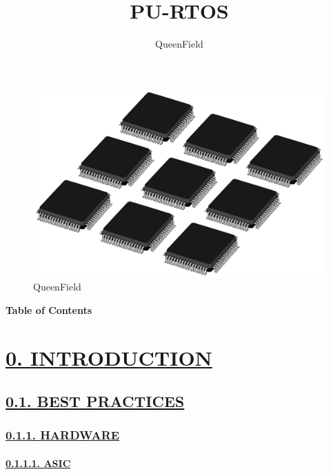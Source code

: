 \documentclass[
]{article}
\title{PU-RTOS}
\author{QueenField}
\date{}
\begin{document}
\maketitle

\begin{figure}
\centering
\includegraphics{../icon.jpg}
\caption{QueenField}
\end{figure}

\textbf{Table of Contents}

\hypertarget{introduction}{%
\section{\texorpdfstring{\protect\hyperlink{introduction-1}{0.
INTRODUCTION}}{0. INTRODUCTION}}\label{introduction}}

\hypertarget{best-practices}{%
\subsection{\texorpdfstring{\protect\hyperlink{best-practices-1}{0.1.
BEST PRACTICES}}{0.1. BEST PRACTICES}}\label{best-practices}}

\hypertarget{hardware}{%
\subsubsection{\texorpdfstring{\protect\hyperlink{hardware-1}{0.1.1.
HARDWARE}}{0.1.1. HARDWARE}}\label{hardware}}

\hypertarget{asic}{%
\paragraph{\texorpdfstring{\protect\hyperlink{asic-1}{0.1.1.1.
ASIC}}{0.1.1.1. ASIC}}\label{asic}}
\end{document}
